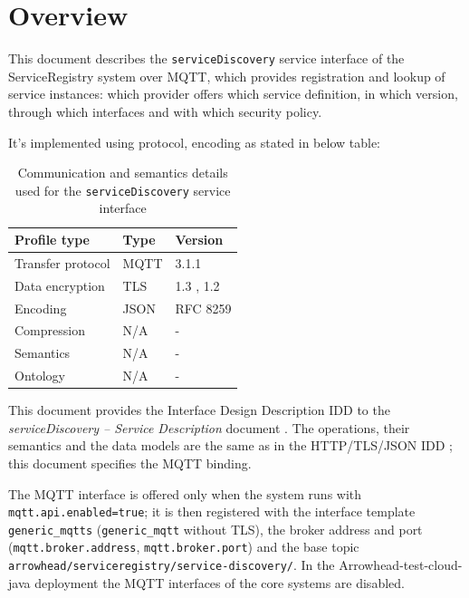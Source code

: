 \documentclass[a4paper]{arrowhead}
\begin{document}
\section{Overview}
\label{sec:overview}

This document describes the \texttt{serviceDiscovery} service interface of the ServiceRegistry system over MQTT, which provides registration and lookup of service instances: which provider offers which service definition, in which version, through which interfaces and with which security policy.

It's implemented using protocol, encoding as stated in below table:
\begin{table}[ht!]
  \centering
  \begin{tabular}{|l|l|l|}
    \hline
    \rowcolor{gray!33} Profile type & Type & Version \\ \hline
    Transfer protocol & MQTT & 3.1.1 \cite{mqtt311} \\ \hline
    Data encryption & TLS & 1.3 \cite{rfc8446}, 1.2 \cite{rfc5246} \\ \hline
    Encoding & JSON & RFC 8259 \cite{rfc8259} \\ \hline
    Compression & N/A & - \\ \hline
    Semantics & N/A & - \\ \hline
    Ontology & N/A & - \\ \hline
  \end{tabular}
  \caption{Communication and semantics details used for the \texttt{serviceDiscovery} service interface}
  \label{tab:comunication_semantics_profile}
\end{table}

This document provides the Interface Design Description IDD to the \textit{serviceDiscovery -- Service Description} document \cite{sr-serviceDiscovery-sd}.
The operations, their semantics and the data models are the same as in the HTTP/TLS/JSON IDD \cite{sr-serviceDiscovery-http-idd}; this document specifies the MQTT binding.

The MQTT interface is offered only when the system runs with \texttt{mqtt.api.enabled=true}; it is then registered with the interface template \texttt{generic\_\allowbreak{}mqtts} (\texttt{generic\_\allowbreak{}mqtt} without TLS), the broker address and port (\texttt{mqtt.\allowbreak{}broker.\allowbreak{}address}, \texttt{mqtt.\allowbreak{}broker.\allowbreak{}port}) and the base topic \texttt{arrowhead/\allowbreak{}serviceregistry/\allowbreak{}service-\allowbreak{}discovery/\allowbreak{}}. In the Arrowhead-test-cloud-java deployment the MQTT interfaces of the core systems are disabled.
\end{document}
